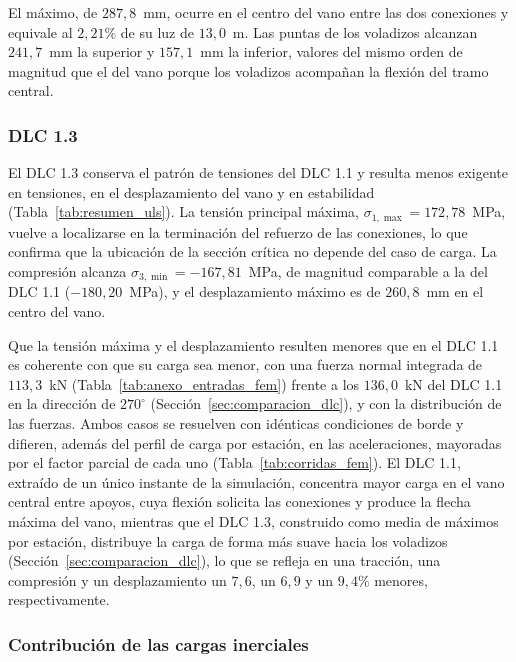 El máximo, de $287{,}8$~mm, ocurre en el centro del vano entre las dos conexiones y equivale al $2{,}21\%$ de su luz de $13{,}0$~m. Las puntas de los voladizos alcanzan $241{,}7$~mm la superior y $157{,}1$~mm la inferior, valores del mismo orden de magnitud que el del vano porque los voladizos acompañan la flexión del tramo central.

\subsubsection{DLC 1.3}

El DLC 1.3 conserva el patrón de tensiones del DLC 1.1 y resulta menos exigente en tensiones, en el desplazamiento del vano y en estabilidad (Tabla~\ref{tab:resumen_uls}). La tensión principal máxima, $\sigma_{1,\max} = 172{,}78$~MPa, vuelve a localizarse en la terminación del refuerzo de las conexiones, lo que confirma que la ubicación de la sección crítica no depende del caso de carga. La compresión alcanza $\sigma_{3,\min} = -167{,}81$~MPa, de magnitud comparable a la del DLC 1.1 ($-180{,}20$~MPa), y el desplazamiento máximo es de $260{,}8$~mm en el centro del vano.

Que la tensión máxima y el desplazamiento resulten menores que en el DLC 1.1 es coherente con que su carga sea menor, con una fuerza normal integrada de $113{,}3$~kN (Tabla~\ref{tab:anexo_entradas_fem}) frente a los $136{,}0$~kN del DLC 1.1 en la dirección de $270^\circ$ (Sección~\ref{sec:comparacion_dlc}), y con la distribución de las fuerzas. Ambos casos se resuelven con idénticas condiciones de borde y difieren, además del perfil de carga por estación, en las aceleraciones, mayoradas por el factor parcial de cada uno (Tabla~\ref{tab:corridas_fem}). El DLC 1.1, extraído de un único instante de la simulación, concentra mayor carga en el vano central entre apoyos, cuya flexión solicita las conexiones y produce la flecha máxima del vano, mientras que el DLC 1.3, construido como media de máximos por estación, distribuye la carga de forma más suave hacia los voladizos (Sección~\ref{sec:comparacion_dlc}), lo que se refleja en una tracción, una compresión y un desplazamiento un $7{,}6$, un $6{,}9$ y un $9{,}4\%$ menores, respectivamente.

\subsubsection{Contribución de las cargas inerciales}
\label{sec:solo_inercial}

